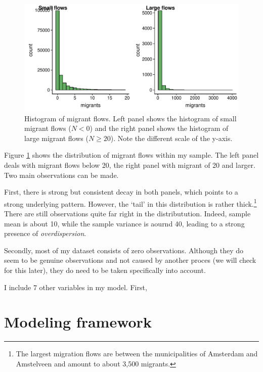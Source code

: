 \documentclass[fleqn,10pt]{SelfArx} %
\begin{document}
        \begin{figure}[ht]\centering %
          \includegraphics[width=0.8\linewidth]{../fig/hist_mig.pdf}
          \caption{Histogram of migrant flows. Left panel shows the
            histogram of small migrant flows ($N<0$) and the right
            panel shows the histogram of large migrant flows
            ($N \geq 20$). Note the different scale of the y-axis.}
          \label{fig:hist_mig}
        \end{figure}

        Figure \ref{fig:hist_mig} shows the distribution of migrant
        flows within my sample. The left panel deals with migrant
        flows below 20, the right panel with migrant of 20 and
        larger. Two main observations can be made.

        First, there is strong but consistent decay in both panels,
        which points to a strong underlying pattern. However, the
        `tail' in this distribution is rather thick.\footnote{The
          largest migration flows are between the municipalities of
          Amsterdam and Amstelveen and amount to about 3,500
          migrants.} There are still observations quite far right in
        the distributution. Indeed, sample mean is about 10, while the
        sample variance is aournd 40, leading to a strong presence of
        \emph{overdispersion}.

        Secondly, most of my dataset consists of zero
        observations. Although they do seem to be genuine observations
        and not caused by another proces (we will check for this
        later), they do need to be taken specifically into account. 

        I include 7 other variables in my model. First, 
        
        \section{Modeling framework}
\end{document}
